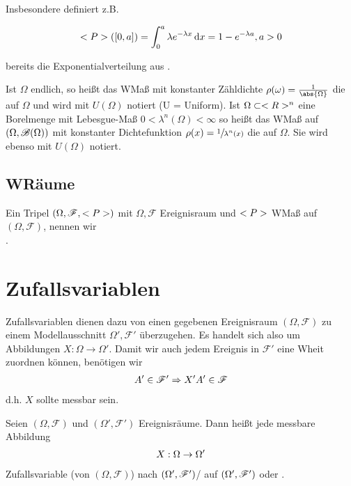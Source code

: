 Insbesondere definiert z.B.

\begin{align}
	<P>([0,a]) = \int_{0}^{a} \lambda e^{-\lambda x}\,\mathrm{d} x = 1 - e^{-\lambda a}, a > 0 \notag
\end{align}

bereits die Exponentialverteilung aus .

\begin{definition}[Gleichverteilung]
	Ist $\Omega$ endlich, so heißt das WMaß mit konstanter Zähldichte $\rho(\omega) = \frac{1}{\abs{\Omega}}$ die  auf $\Omega$ und wird mit $U(\Omega)$ notiert (U = Uniform).
	Ist $\Omega \subset <R>^n$ eine Borelmenge mit Lebesgue-Maß $0 < \lambda^n(\Omega) < \infty$ so heißt das WMaß auf $(\Omega, \mathscr{B}(\Omega))$ mit konstanter Dichtefunktion $\rho(x) = \sfrac{1}{\lambda^n(x)}$ die  auf $\Omega$. 
	Sie wird ebenso mit $U(\Omega)$ notiert.
\end{definition}

\subsection*{WRäume}

\begin{definition}[Wahrscheinlichkeitsraum]
	Ein Tripel $(\Omega, \mathscr{F}, <P>)$ mit $\Omega, \mathscr{F}$ Ereignisraum und $<P>$ WMaß auf $(\Omega, \mathscr{F})$, nennen wir \\ .
\end{definition}

\section{Zufallsvariablen}

Zufallsvariablen dienen dazu von einen gegebenen Ereignisraum $(\Omega, \mathscr{F})$ zu einem Modellausschnitt $\Omega', \mathscr{F}'$ überzugehen. 
Es handelt sich also um Abbildungen $X: \Omega \to \Omega'$.
Damit wir auch jedem Ereignis in $\mathscr{F}'$ eine Wheit zuordnen können, benötigen wir	
\begin{align}
	A' \in \mathscr{F}' \Rightarrow X' A' \in \mathscr{F} \notag		
\end{align}
d.h. $X$ sollte messbar sein.

\begin{definition}[Zufallsvariable]
	Seien $(\Omega, \mathscr{F})$ und $(\Omega', \mathscr{F}')$ Ereignisräume. Dann heißt jede messbare Abbildung
	\begin{align}
		X: \Omega \to \Omega'\notag
	\end{align}
	Zufallsvariable (von $(\Omega, \mathscr{F})$) nach $(\Omega', \mathscr{F}')$/ auf $(\Omega', \mathscr{F}')$ oder .
\end{definition}

